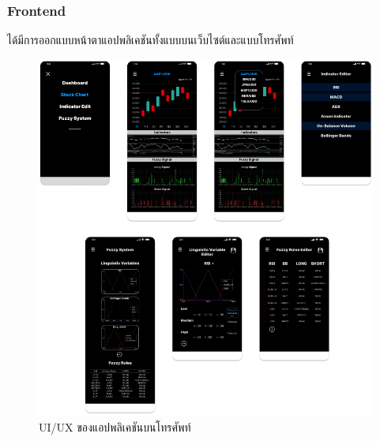 \subsubsection{Frontend}
ได้มีการออกแบบหน้าตาแอปพลิเคชันทั้งแบบบนเว็บไซต์และแบบโทรศัพท์
\begin{figure}[ht]
    \centering
    \includegraphics[width=\textwidth]{images/mobile_uiux.png}
    \caption{UI/UX ของแอปพลิเคชันบนโทรศัพท์}
\end{figure}

